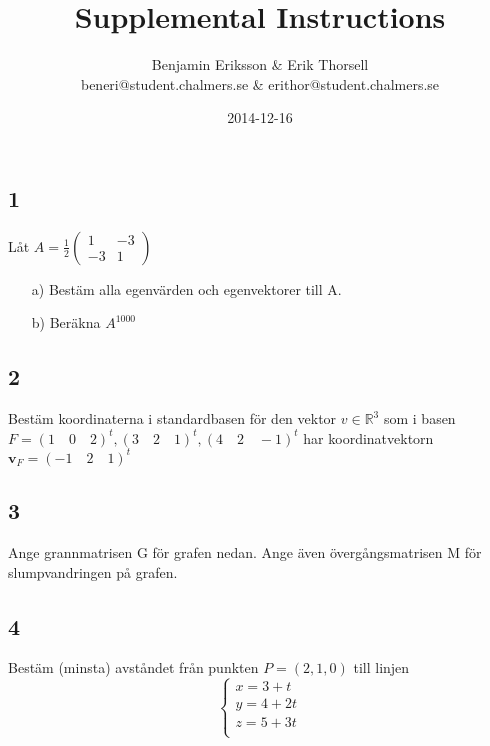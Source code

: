 \documentclass{article}
\title{Supplemental Instructions}
\author{Benjamin Eriksson \& Erik Thorsell \\ 
		\small{beneri@student.chalmers.se} \&
		\small{erithor@student.chalmers.se}
}
\date{
     2014-12-16 
 }
\begin{document}
\maketitle

\subsection*{1}
Låt 
$
A = \frac{1}{2}
\begin{pmatrix}
	1 & -3 \\
	-3 & 1 
\end{pmatrix}
$
\begin{itemize}
\item[a) ] Bestäm alla egenvärden och egenvektorer till A.
\item[b) ] Beräkna $A^{1000}$
\end{itemize}

\subsection*{2}
Bestäm koordinaterna i standardbasen för den vektor $v \in \mathbb{R}^3$ som i basen \\ $F = (1 \quad 0 \quad 2)^t, (3 \quad 2 \quad 1)^t, (4 \quad 2 \quad -1)^t$ har koordinatvektorn $\mathbf{v}_{F} = (-1 \quad 2 \quad 1)^t$
\subsection*{3}
Ange grannmatrisen G för grafen nedan. Ange även övergångsmatrisen M för slumpvandringen på grafen.
\\

\subsection*{4}
Bestäm (minsta) avståndet från punkten $P = (2,1,0)$ till linjen
\begin{equation}
    \begin{cases}
        x = 3 + t \\
        y = 4 + 2t \\
        z = 5 + 3t \\
    \end{cases}
\end{equation}
\end{document}
